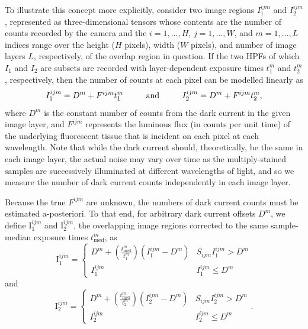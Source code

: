 \documentclass[letterpaper,11pt]{article}
\newcommand{\Iota}{\mathrm{I}}
\begin{document}
To illustrate this concept more explicitly, consider two image regions $I^{ijm}_{1}$ and $I^{ijm}_{2}$, represented as three-dimensional tensors whose contents are the number of counts recorded by the camera and the $i=1, \ldots, H$, $j = 1, \ldots, W$, and $m = 1, \ldots, L$ indices range over the height ($H$ pixels), width ($W$ pixels), and number of image layers $L$, respectively, of the overlap region in question. If the two HPFs of which $I_{1}$ and $I_{2}$ are subsets are recorded with layer-dependent exposure times $t^{m}_{1}$ and $t^{m}_{2}$, respectively, then the number of counts at each pixel can be modelled linearly as
\begin{equation}
I^{ijm}_{1} = D^{m} + F^{ijm} t^{m}_{1} \hspace{0.08\textwidth} \mathrm{and} \hspace{0.08\textwidth} I^{ijm}_{2} = D^{m} + F^{ijm} t^{m}_{2},
\end{equation}
where $D^{m}$ is the constant number of counts from the dark current in the given image layer, and $F^{ijm}$ represents the luminous flux (in counts per unit time) of the underlying fluorescent tissue that is incident on each pixel at each wavelength. Note that while the dark current should, theoretically, be the same in each image layer, the actual noise may vary over time as the multiply-stained samples are successively illuminated at different wavelengths of light, and so we measure the number of dark current counts independently in each image layer.

Because the true $F^{ijm}$ are unknown, the numbers of dark current counts must be estimated a-posteriori. To that end, for arbitrary dark current offsets $D^{m}$, we define $\Iota^{ijm}_{1}$ and $\Iota^{ijm}_{2}$, the overlapping image regions corrected to the same sample-median exposure times $t^{m}_{\mathrm{med}}$, as
\begin{equation}
\Iota^{ijm}_{1} = 
\begin{cases} 
      D^{m}+\left(\frac{t^{m}_{\mathrm{med}}}{t^{m}_{1}}\right)\left(I^{ijm}_{1}-D^{m}\right) & S_{ijm} I^{ijm}_{1} > D^{m}  \\
      I^{ijm}_{1} & I^{ijm}_{1} \leq D^{m} 
\end{cases}
\end{equation}
and
\begin{equation}
\Iota^{ijm}_{2} = 
\begin{cases} 
      D^{m}+\left(\frac{t^{m}_{\mathrm{med}}}{t^{m}_{2}}\right)\left(I^{ijm}_{2}-D^{m}\right) & S_{ijm} I^{ijm}_{2} > D^{m}  \\
      I^{ijm}_{2} & I^{ijm}_{2} \leq D^{m} 
\end{cases}
.
\end{equation}
\end{document}
